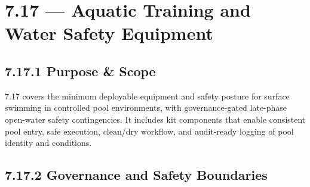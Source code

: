 \documentclass[10pt]{article}
\begin{document}
\section*{7.17 — Aquatic Training and Water Safety Equipment}
{}

\subsection*{7.17.1 Purpose \& Scope}
{}

7.17 covers the minimum deployable equipment and safety posture for surface swimming in controlled pool environments, with governance-gated late-phase open-water safety contingencies. It includes kit components that enable consistent pool entry, safe execution, clean/dry workflow, and audit-ready logging of pool identity and conditions.

\subsection*{7.17.2 Governance and Safety Boundaries}
{}
\end{document}
